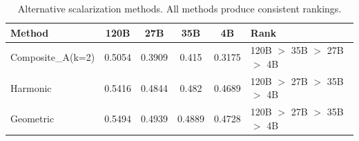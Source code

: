 \begin{table}[t]
\centering
\caption{Alternative scalarization methods. All methods produce consistent rankings.}
\label{tab:alt_scalar}
\small
\begin{tabular}{lccccl}
\toprule
\textbf{Method} & \textbf{120B} & \textbf{27B} & \textbf{35B} & \textbf{4B} & \textbf{Rank} \\
\midrule
Composite_A(k=2) & 0.5054 & 0.3909 & 0.415 & 0.3175 & 120B $>$ 35B $>$ 27B $>$ 4B \\
Harmonic & 0.5416 & 0.4844 & 0.482 & 0.4689 & 120B $>$ 27B $>$ 35B $>$ 4B \\
Geometric & 0.5494 & 0.4939 & 0.4889 & 0.4728 & 120B $>$ 27B $>$ 35B $>$ 4B \\
\bottomrule
\end{tabular}
\end{table}